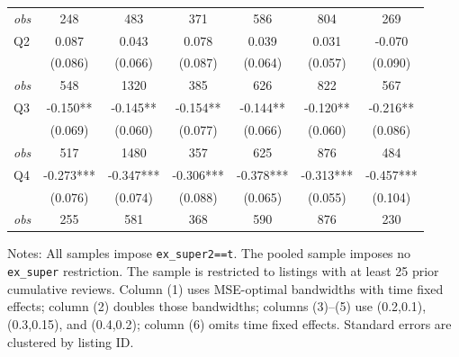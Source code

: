 \begin{table}[!htbp]
\begin{tabular}{lcccccc}
\textit{obs} & 248 & 483 & 371 & 586 & 804 & 269 \\
Q2 & 0.087 & 0.043 & 0.078 & 0.039 & 0.031 & -0.070 \\
 & (0.086) & (0.066) & (0.087) & (0.064) & (0.057) & (0.090) \\
\textit{obs} & 548 & 1320 & 385 & 626 & 822 & 567 \\
Q3 & -0.150** & -0.145** & -0.154** & -0.144** & -0.120** & -0.216** \\
 & (0.069) & (0.060) & (0.077) & (0.066) & (0.060) & (0.086) \\
\textit{obs} & 517 & 1480 & 357 & 625 & 876 & 484 \\
Q4 & -0.273*** & -0.347*** & -0.306*** & -0.378*** & -0.313*** & -0.457*** \\
 & (0.076) & (0.074) & (0.088) & (0.065) & (0.055) & (0.104) \\
\textit{obs} & 255 & 581 & 368 & 590 & 876 & 230 \\
\bottomrule
\end{tabular}
\begin{minipage}{0.98\textwidth}\footnotesize
Notes: All samples impose \texttt{ex\_super2==t}. The pooled sample imposes no \texttt{ex\_super} restriction. The sample is restricted to listings with at least 25 prior cumulative reviews. Column (1) uses MSE-optimal bandwidths with time fixed effects; column (2) doubles those bandwidths; columns (3)--(5) use (0.2,0.1), (0.3,0.15), and (0.4,0.2); column (6) omits time fixed effects. Standard errors are clustered by listing ID.
\end{minipage}
\end{table}

